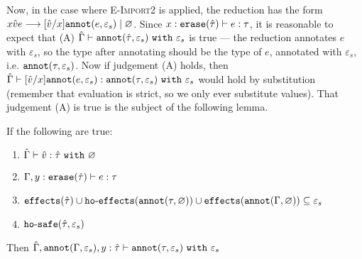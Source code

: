 Now, in the case where \textsc{E-Import2} is applied, the reduction has the form
${x}{\hat v}{e} \longrightarrow
[\hat v/x]\mathtt{annot}(e, \varepsilon_s) \mid \varnothing$. Since
$x: \mathtt{erase}(\hat \tau) \vdash e: \tau$, it is reasonable to expect that (A) $\hat
\Gamma \vdash \mathtt{annot}(\hat \tau, \varepsilon_s)~\mathtt{with}~ \varepsilon_s$ is true
--- the reduction annotates $e$ with $\varepsilon_s$, so the type after annotating
should be the type of $e$, annotated with $\varepsilon_s$, i.e.
$\mathtt{annot}(\tau, \varepsilon_s)$. Now if judgement (A) holds, then $\hat \Gamma
\vdash [\hat v/x]\mathtt{annot}(e, \varepsilon_s): \mathtt{annot}(\tau, \varepsilon_s)~\mathtt{with}~
\varepsilon_s$ would hold by substitution (remember that evaluation is strict, so
we only ever substitute values). That judgement (A) is true is the subject of the
following lemma.

\begin{lemma}
If the following are true:

\begin{enumerate}
	\item $\hat \Gamma \vdash \hat v: \hat \tau ~ \mathtt{with}~ \varnothing$
	\item $\Gamma, y: \mathtt{erase}(\hat \tau) \vdash e: \tau$
	\item $\mathtt{effects}(\hat \tau) \cup \mathtt{ho \hbox{-} effects}(\mathtt{annot}(\tau, \varnothing)) \cup
		\mathtt{effects}(\mathtt{annot}(\Gamma, \varnothing)) \subseteq \varepsilon_s$
	\item $\mathtt{ho \hbox{-} safe}(\hat \tau, \varepsilon_s)$
\end{enumerate}

Then $\hat \Gamma, \mathtt{annot}(\Gamma, \varepsilon_s), y: \hat \tau \vdash
	\mathtt{annot}(\tau, \varepsilon_s) ~\mathtt{with}~ \varepsilon_s$
\end{lemma}

